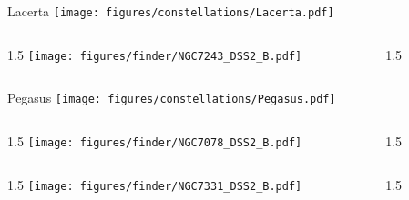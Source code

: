 \documentclass[final]{beamer}
\newlength{\colwidth}
\begin{document}

\begin{frame}[t]{\LARGE Lacerta}
    \centering
    \texttt{[image: figures/constellations/Lacerta.pdf]}
\end{frame}


\begin{frame}[t]{}
    \begin{columns}[T]
        \begin{column}{1.5\colwidth}
            \centering
            \texttt{[image: figures/finder/NGC7243\_DSS2\_B.pdf]}
        \end{column}
        \begin{column}{1.5\colwidth}
            \Large
            
        \end{column}
    \end{columns}
    \vspace{\fill}
\end{frame}


\begin{frame}[t]{\LARGE Pegasus}
    \centering
    \texttt{[image: figures/constellations/Pegasus.pdf]}
\end{frame}


\begin{frame}[t]{}
    \begin{columns}[T]
        \begin{column}{1.5\colwidth}
            \centering
            \texttt{[image: figures/finder/NGC7078\_DSS2\_B.pdf]}
        \end{column}
        \begin{column}{1.5\colwidth}
            \Large
            
        \end{column}
    \end{columns}
    \vspace{\fill}
    \begin{columns}[T]
        \begin{column}{1.5\colwidth}
            \centering
            \texttt{[image: figures/finder/NGC7331\_DSS2\_B.pdf]}
        \end{column}
        \begin{column}{1.5\colwidth}
            \Large
            
        \end{column}
    \end{columns}
\end{frame}
\end{document}
